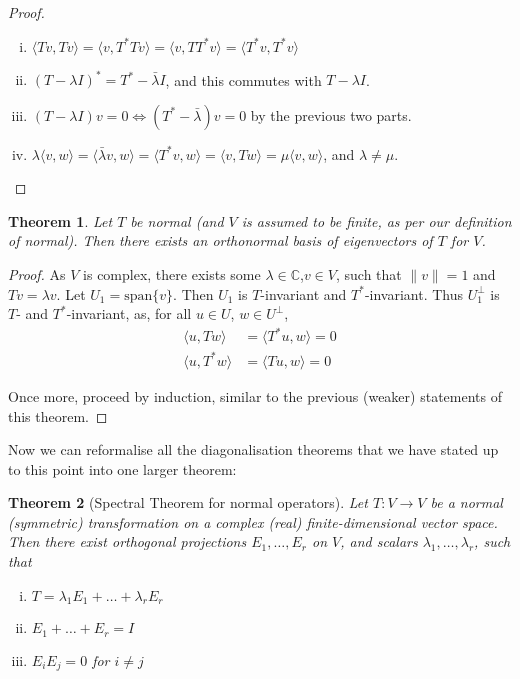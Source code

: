 \documentclass[10pt,fleqn]{article}
\newcommand{\spa}{\mathrm{span}}
\newcommand{\comps}{\mathbb{C}}
\theoremstyle{definition} \newtheorem{defn}{Definition}[section]
\theoremstyle{plain}      \newtheorem{thm}[defn]{Theorem}
\theoremstyle{plain}      \newtheorem{prop}[defn]{Proposition}
\theoremstyle{plain}      \newtheorem{lem}[defn]{Lemma}
\theoremstyle{plain}      \newtheorem{cor}[defn]{Corollary}
\theoremstyle{plain}      \newtheorem{ad}[defn]{Addendum}
\theoremstyle{definition} \newtheorem{ex}[defn]{Example}
\theoremstyle{definition} \newtheorem{rem}[defn]{Remark}
\numberwithin{equation}{subsection}
\begin{document}
\begin{proof}
    \begin{enumerate}[(i)]
        \item $\langle Tv,Tv\rangle=\langle v,T^*Tv\rangle=\langle v,TT^*v\rangle=\langle T^*v,T^*v\rangle$
        \item $(T-\lambda I)^*=T^*-\bar{\lambda}I$, and this commutes with $T-\lambda I$.
        \item $(T-\lambda I)v=0\iff(T^*-\bar{\lambda})v=0$ by the previous two parts.
        \item $\lambda\langle v,w\rangle=\langle\bar{\lambda}v,w\rangle=\langle T^*v,w\rangle=\langle v,Tw\rangle=\mu\langle v,w\rangle$, and $\lambda\neq\mu$.
    \end{enumerate}
\end{proof}

\begin{thm}
    Let $T$ be normal (and $V$ is assumed to be finite, as per our definition of normal).
    Then there exists an orthonormal basis of eigenvectors of $T$ for $V$.
\end{thm}

\begin{proof}
    As $V$ is complex, there exists some $\lambda\in\comps$,$v\in V$, such that $\|v\|=1$ and $Tv=\lambda v$.
    Let $U_1=\spa\{v\}$.
    Then $U_1$ is $T$-invariant and $T^*$-invariant.
    Thus $U_1^{\perp}$ is $T$- and $T^*$-invariant, as, for all $u\in U$, $w\in U^{\perp}$,
    \begin{align*}
        \langle u,Tw\rangle
        &=
        \langle T^*u,w\rangle=
        0\\
        \langle u,T^*w\rangle
        &=
        \langle Tu,w\rangle=
        0
    \end{align*}

    Once more, proceed by induction, similar to the previous (weaker) statements of this theorem.
\end{proof}

Now we can reformalise all the diagonalisation theorems that we have stated up to this point into one larger theorem:
\begin{thm}[Spectral Theorem for normal operators]
    Let $T:V\to V$ be a normal (symmetric) transformation on a complex (real) finite-dimensional vector space.
    Then there exist orthogonal projections $E_1,\ldots,E_r$ on $V$, and scalars $\lambda_1,\ldots,\lambda_r$, such that
    \begin{enumerate}[(i)]
        \item $T=\lambda_1 E_1+\ldots+\lambda_r E_r$
        \item $E_1+\ldots+E_r=I$
        \item $E_iE_j=0$ for $i\neq j$
    \end{enumerate}
\end{thm}
\end{document}
